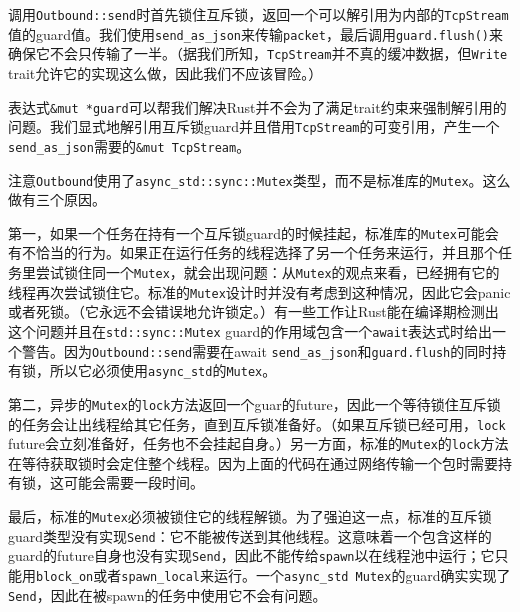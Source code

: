 调用\texttt{Outbound::send}时首先锁住互斥锁，返回一个可以解引用为内部的\texttt{TcpStream}值的guard值。我们使用\texttt{send\_as\_json}来传输\texttt{packet}，最后调用\texttt{guard.flush()}来确保它不会只传输了一半。（据我们所知，\texttt{TcpStream}并不真的缓冲数据，但\texttt{Write} trait允许它的实现这么做，因此我们不应该冒险。）

表达式\texttt{\&mut *guard}可以帮我们解决Rust并不会为了满足trait约束来强制解引用的问题。我们显式地解引用互斥锁guard并且借用\texttt{TcpStream}的可变引用，产生一个\texttt{send\_as\_json}需要的\texttt{\&mut TcpStream}。

注意\texttt{Outbound}使用了\texttt{async\_std::sync::Mutex}类型，而不是标准库的\texttt{Mutex}。这么做有三个原因。

第一，如果一个任务在持有一个互斥锁guard的时候挂起，标准库的\texttt{Mutex}可能会有不恰当的行为。如果正在运行任务的线程选择了另一个任务来运行，并且那个任务里尝试锁住同一个\texttt{Mutex}，就会出现问题：从\texttt{Mutex}的观点来看，已经拥有它的线程再次尝试锁住它。标准的\texttt{Mutex}设计时并没有考虑到这种情况，因此它会panic或者死锁。（它永远不会错误地允许锁定。）有一些工作让Rust能在编译期检测出这个问题并且在\texttt{std::sync::Mutex} guard的作用域包含一个\texttt{await}表达式时给出一个警告。因为\texttt{Outbound::send}需要在await \texttt{send\_as\_json}和\texttt{guard.flush}的同时持有锁，所以它必须使用\texttt{async\_std}的\texttt{Mutex}。

第二，异步的\texttt{Mutex}的\texttt{lock}方法返回一个guar的future，因此一个等待锁住互斥锁的任务会让出线程给其它任务，直到互斥锁准备好。（如果互斥锁已经可用，\texttt{lock} future会立刻准备好，任务也不会挂起自身。）另一方面，标准的\texttt{Mutex}的\texttt{lock}方法在等待获取锁时会定住整个线程。因为上面的代码在通过网络传输一个包时需要持有锁，这可能会需要一段时间。

最后，标准的\texttt{Mutex}必须被锁住它的线程解锁。为了强迫这一点，标准的互斥锁guard类型没有实现\texttt{Send}：它不能被传送到其他线程。这意味着一个包含这样的guard的future自身也没有实现\texttt{Send}，因此不能传给\texttt{spawn}以在线程池中运行；它只能用\texttt{block\_on}或者\texttt{spawn\_local}来运行。一个\texttt{async\_std Mutex}的guard确实实现了\texttt{Send}，因此在被spawn的任务中使用它不会有问题。

